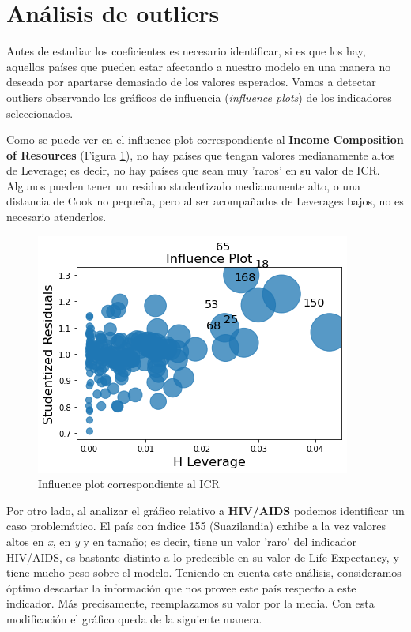 \section{Análisis de outliers}

Antes de estudiar los coeficientes es necesario identificar, si es que los hay, aquellos países que pueden estar afectando a nuestro modelo en una manera no deseada por apartarse demasiado de los valores esperados.
Vamos a detectar outliers observando los gráficos de influencia (\textit{influence plots}) de los indicadores seleccionados.

Como se puede ver en el influence plot correspondiente al \textbf{Income Composition of Resources} (Figura \ref{fig:inf_icr}), no hay países que tengan valores medianamente altos de Leverage; es decir, no hay países que sean muy 'raros' en su valor de ICR. Algunos pueden tener un residuo studentizado medianamente alto, o una distancia de Cook no pequeña, pero al ser acompañados de Leverages bajos, no es necesario atenderlos.

\begin{figure}[H]
            \centering
             \includegraphics[scale = 0.5]{img/influ/icr.png}
             \caption{Influence plot correspondiente al ICR}
             \label{fig:inf_icr}
\end{figure}

Por otro lado, al analizar el gráfico relativo a \textbf{HIV/AIDS} podemos identificar un caso problemático.
El país con índice 155 (Suazilandia) exhibe a la vez valores altos en \textit{x}, en \textit{y} y en tamaño; es decir, tiene un valor 'raro' del indicador HIV/AIDS, es bastante distinto a lo predecible en su valor de Life Expectancy, y tiene mucho peso sobre el modelo.
Teniendo en cuenta este análisis, consideramos óptimo descartar la información que nos provee este país respecto a este indicador.
Más precisamente, reemplazamos su valor por la media. 
Con esta modificación el gráfico queda de la siguiente manera.

